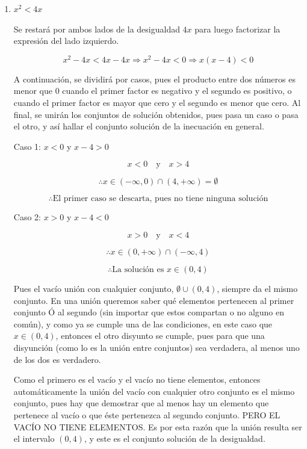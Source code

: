 \documentclass{article}
\begin{document}
\begin{enumerate}
\[ x \in \left( \frac{-5-\sqrt{37}}{2}, -5 \right) \cup \left( \frac{-5+\sqrt{37}}{2}, +\infty \right), \quad x = -5 \]

Por lo tanto, la solución es \( x \in \left( \frac{-5-\sqrt{37}}{2}, -5 \right) \cup \left( \frac{-5+\sqrt{37}}{2}, +\infty \right) \).\\
  
  \item \(x^2<4x\)

Se restará por ambos lados de la desigualdad \(4x\) para luego factorizar la expresión del lado izquierdo.

\[ x^2 - 4x < 4x - 4x \Rightarrow x^2 - 4x < 0 \Rightarrow x(x-4) < 0 \]

A continuación, se dividirá por casos, pues el producto entre dos números es menor que 0 cuando el primer factor es negativo y el segundo es positivo, o cuando el primer factor es mayor que cero y el segundo es menor que cero. Al final, se unirán los conjuntos de solución obtenidos, pues pasa un caso o pasa el otro, y así hallar el conjunto solución de la inecuación en general.

Caso 1: \(x < 0\) y \(x-4 > 0\)

\[ x < 0 \quad \text{y} \quad x > 4 \]

\[\therefore x \in (-\infty, 0) \cap (4, +\infty) = \emptyset \]

\[\therefore \text{El primer caso se descarta, pues no tiene ninguna solución}\]

Caso 2: \(x > 0\) y \(x-4 < 0\)

\[ x > 0 \quad \text{y} \quad x < 4 \]

\[\therefore x \in (0, +\infty) \cap (-\infty, 4)\]

\[\therefore \text{La solución es } x \in (0,4)\]

Pues el vacío unión con cualquier conjunto, \(\emptyset \cup (0,4)\), siempre da el mismo conjunto. En una unión queremos saber qué elementos pertenecen al primer conjunto Ó al segundo (sin importar que estos compartan o no alguno en común), y como ya se cumple una de las condiciones, en este caso que \(x \in (0,4)\), entonces el otro disyunto se cumple, pues para que una disyunción (como lo es la unión entre conjuntos) sea verdadera, al menos uno de los dos es verdadero.

Como el primero es el vacío y el vacío no tiene elementos, entonces automáticamente la unión del vacío con cualquier otro conjunto es el mismo conjunto, pues hay que demostrar que al menos hay un elemento que pertenece al vacío o que éste pertenezca al segundo conjunto. PERO EL VACÍO NO TIENE ELEMENTOS. Es por esta razón que la unión resulta ser el intervalo \((0,4)\), y este es el conjunto solución de la desigualdad.



\end{enumerate}
\end{document}
